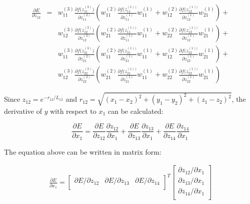 \documentclass{article}
\begin{document}
\begin{eqnarray}
\frac{\partial{E}}{\partial{z_{12}}} 
& = &
w^{(3)}_{11}\frac{\partial{f(z_{11}^{(3)}})}{\partial{z_{11}^{(2)}}} \left(
	w_{11}^{(2)}\frac{\partial{f(z_{11}^{(1))}}}{\partial{z_{11}^{(1)}}}w^{(1)}_{11} +
	w_{12}^{(2)}\frac{\partial{f(z_{12}^{(1))}}}{\partial{z_{12}^{(1)}}}w^{(1)}_{21}  
\right) + \nonumber \\
&& w^{(3)}_{12}\frac{\partial{f(z_{12}^{(3)}})}{\partial{z_{12}^{(2)}}} \left(
	w_{21}^{(2)}\frac{\partial{f(z_{11}^{(1))}}}{\partial{z_{11}^{(1)}}}w^{(1)}_{11} +
	w_{22}^{(2)}\frac{\partial{f(z_{12}^{(1))}}}{\partial{z_{12}^{(1)}}}w^{(1)}_{21}  
\right) + \nonumber \\
&& w^{(3)}_{11}\frac{\partial{f(z_{21}^{(3)}})}{\partial{z_{21}^{(2)}}} \left(
	w_{11}^{(2)}\frac{\partial{f(z_{21}^{(1))}}}{\partial{z_{21}^{(1)}}}w^{(1)}_{11} +
	w_{12}^{(2)}\frac{\partial{f(z_{22}^{(1))}}}{\partial{z_{22}^{(1)}}}w^{(1)}_{21}  
\right) + \nonumber \\
&& w^{(3)}_{12}\frac{\partial{f(z_{22}^{(3)}})}{\partial{z_{22}^{(2)}}} \left(
	w_{21}^{(2)}\frac{\partial{f(z_{21}^{(1))}}}{\partial{z_{21}^{(1)}}}w^{(1)}_{11} +
	w_{22}^{(2)}\frac{\partial{f(z_{22}^{(1))}}}{\partial{z_{22}^{(1)}}}w^{(1)}_{21}  
\right)
\end{eqnarray} 

\noindent Since $z_{12} = e^{-r_{12} / L_{12}}$ and 
$r_{12} = \sqrt{(x_1 - x_2)^2 + (y_1 - y_2)^2 + (z_1 - z_2)^2}$, the derivative of $y$ 
with respect to $x_1$ can be calculated:

\begin{equation}
\frac{\partial{E}}{\partial{x_1}} = 
\frac{\partial{E}}{\partial{z_{12}}}\frac{\partial{z_{12}}}{\partial{x_{1}}} +
\frac{\partial{E}}{\partial{z_{13}}}\frac{\partial{z_{13}}}{\partial{x_{1}}} +
\frac{\partial{E}}{\partial{z_{14}}}\frac{\partial{z_{14}}}{\partial{x_{1}}}
\end{equation}

\noindent The equation above can be written in matrix form:

\begin{eqnarray}
\frac{\partial{E}}{\partial{x_1}} = \left[\begin{array}{ccc}
	\partial{E} / \partial{z_{12}} &
	\partial{E} / \partial{z_{13}} &
	\partial{E} / \partial{z_{14}} \\
\end{array}
\right]^T
\left[\begin{array}{c}
	\partial{z_{12}} / \partial{x_{1}} \\
	\partial{z_{13}} / \partial{x_{1}} \\
	\partial{z_{14}} / \partial{x_{1}} \\
\end{array}
\right]
\end{eqnarray}
\end{document}
